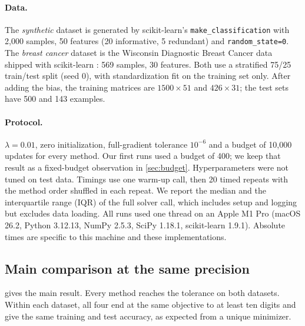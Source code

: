 \documentclass{article}
\begin{document}
\paragraph{Data.}
The \emph{synthetic} dataset is generated by scikit-learn's \texttt{make\_classification} with 2{,}000 samples, 50 features (20 informative, 5 redundant) and \texttt{random\_state=0}. The \emph{breast cancer} dataset is the Wisconsin Diagnostic Breast Cancer data shipped with scikit-learn \citep{street1993nuclear,pedregosa2011scikit}: 569 samples, 30 features. Both use a stratified 75/25 train/test split (seed 0), with standardization fit on the training set only. After adding the bias, the training matrices are $1500\times51$ and $426\times31$; the test sets have 500 and 143 examples.

\paragraph{Protocol.}
$\lambda=0.01$, zero initialization, full-gradient tolerance $10^{-6}$ and a budget of 10{,}000 updates for every method. Our first runs used a budget of 400; we keep that result as a fixed-budget observation in \cref{sec:budget}. Hyperparameters were not tuned on test data. Timings use one warm-up call, then 20 timed repeats with the method order shuffled in each repeat. We report the median and the interquartile range (IQR) of the full solver call, which includes setup and logging but excludes data loading. All runs used one thread on an Apple M1 Pro (macOS 26.2, Python 3.12.13, NumPy 2.5.3, SciPy 1.18.1, scikit-learn 1.9.1). Absolute times are specific to this machine and these implementations.

\subsection{Main comparison at the same precision}
 gives the main result. Every method reaches the tolerance on both datasets. Within each dataset, all four end at the same objective to at least ten digits and give the same training and test accuracy, as expected from a unique minimizer.
\end{document}
